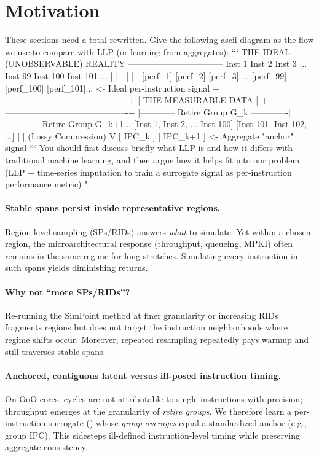 \section{Motivation}
\label{sec:motivation}
These sections need a total rewritten. Give the following ascii diagram as the flow we use to compare with LLP (or learning from aggregates): ```
THE IDEAL (UNOBSERVABLE) REALITY
  ---------------------------------
  Inst 1   Inst 2   Inst 3   ...   Inst 99   Inst 100   Inst 101 ...
    |        |        |               |         |          |
 [perf_1] [perf_2] [perf_3] ...   [perf_99] [perf_100] [perf_101]...  <- Ideal per-instruction signal
          +-------------------------------------------+
          |           THE MEASURABLE DATA             |
          +-------------------------------------------+
          |------------ Retire Group G_k -------------|------------ Retire Group G_k+1...
  [Inst 1, Inst 2, ... Inst 100]  [Inst 101, Inst 102, ...]
                  |
                  | (Lossy Compression)
                  V
              [ IPC_k ]                           [ IPC_k+1 ]        <- Aggregate "anchor" signal
              ```
              You should first discuss briefly what LLP is and how it differs with traditional machine learning, and then argue how it helps fit into our problem (LLP + time-series imputation to train a surrogate signal as per-instruction performance metric)
"
\paragraph{Stable spans persist inside representative regions.}
Region-level sampling (SPs/RIDs) answers \emph{what} to simulate. Yet within a chosen region, the microarchitectural response (throughput, queueing, MPKI) often remains in the same regime for long stretches. Simulating every instruction in such spans yields diminishing returns.
\paragraph{Why not “more SPs/RIDs”?}
Re-running the SimPoint method at finer granularity or increasing RIDs fragments regions but does not target the instruction neighborhoods where regime shifts occur. Moreover, repeated resampling repeatedly pays warmup and still traverses stable spans.
\paragraph{Anchored, contiguous latent versus ill-posed instruction timing.}
On OoO cores, cycles are not attributable to single instructions with precision; throughput emerges at the granularity of \emph{retire groups}. We therefore learn a per-instruction surrogate (\pts) whose \emph{group averages} equal a standardized anchor (e.g., group IPC). This sidesteps ill-defined instruction-level timing while preserving aggregate consistency.
